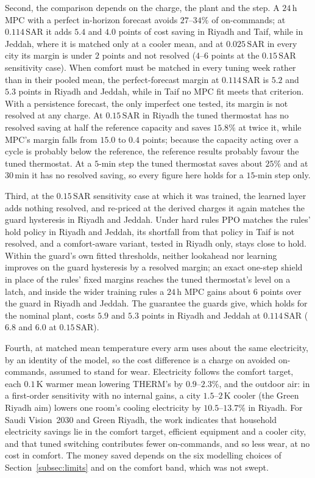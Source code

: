 \documentclass[pdflatex,sn-mathphys-num,iicol]{sn-jnl}
\theoremstyle{thmstyleone}\newtheorem{proposition}{Proposition}\newtheorem{corollary}{Corollary}
\theoremstyle{thmstyletwo}\newtheorem{remark}{Remark}\newtheorem{observation}{Observation}
\theoremstyle{thmstylethree}\newtheorem{definition}{Definition}
\newcommand{\SAR}{\text{SAR}}
\begin{document}
Second, the comparison depends on the charge, the plant and the step. A $24\,$h MPC with a perfect in-horizon forecast avoids $27$--$34\%$ of on-commands; at $0.114\,\SAR$ it adds $5.4$ and $4.0$ points of cost saving in Riyadh and Taif, while in Jeddah, where it is matched only at a cooler mean, and at $0.025\,\SAR$ in every city its margin is under $2$ points and not resolved ($4$--$6$ points at the $0.15\,\SAR$ sensitivity case). When comfort must be matched in every tuning week rather than in their pooled mean, the perfect-forecast margin at $0.114\,\SAR$ is $5.2$ and $5.3$ points in Riyadh and Jeddah, while in Taif no MPC fit meets that criterion. With a persistence forecast, the only imperfect one tested, its margin is not resolved at any charge. At $0.15\,\SAR$ in Riyadh the tuned thermostat has no resolved saving at half the reference capacity and saves $15.8\%$ at twice it, while MPC's margin falls from $15.0$ to $0.4$ points; because the capacity acting over a cycle is probably below the reference, the reference results probably favour the tuned thermostat. At a $5$-min step the tuned thermostat saves about $25\%$ and at $30\,$min it has no resolved saving, so every figure here holds for a $15$-min step only.

Third, at the $0.15\,\SAR$ sensitivity case at which it was trained, the learned layer adds nothing resolved, and re-priced at the derived charges it again matches the guard hysteresis in Riyadh and Jeddah. Under hard rules PPO matches the rules' hold policy in Riyadh and Jeddah, its shortfall from that policy in Taif is not resolved, and a comfort-aware variant, tested in Riyadh only, stays close to hold. Within the guard's own fitted thresholds, neither lookahead nor learning improves on the guard hysteresis by a resolved margin; an exact one-step shield in place of the rules' fixed margins reaches the tuned thermostat's level on a latch, and inside the wider training rules a $24\,$h MPC gains about $6$ points over the guard in Riyadh and Jeddah. The guarantee the guards give, which holds for the nominal plant, costs $5.9$ and $5.3$ points in Riyadh and Jeddah at $0.114\,\SAR$ ($6.8$ and $6.0$ at $0.15\,\SAR$).

Fourth, at matched mean temperature every arm uses about the same electricity, by an identity of the model, so the cost difference is a charge on avoided on-commands, assumed to stand for wear. Electricity follows the comfort target, each $0.1\,$K warmer mean lowering THERM's by $0.9$--$2.3\%$, and the outdoor air: in a first-order sensitivity with no internal gains, a city $1.5$--$2\,$K cooler (the Green Riyadh aim) lowers one room's cooling electricity by $10.5$--$13.7\%$ in Riyadh. For Saudi Vision~2030 and Green Riyadh, the work indicates that household electricity savings lie in the comfort target, efficient equipment and a cooler city, and that tuned switching contributes fewer on-commands, and so less wear, at no cost in comfort. The money saved depends on the six modelling choices of Section~\ref{subsec:limits} and on the comfort band, which was not swept.
\end{document}
